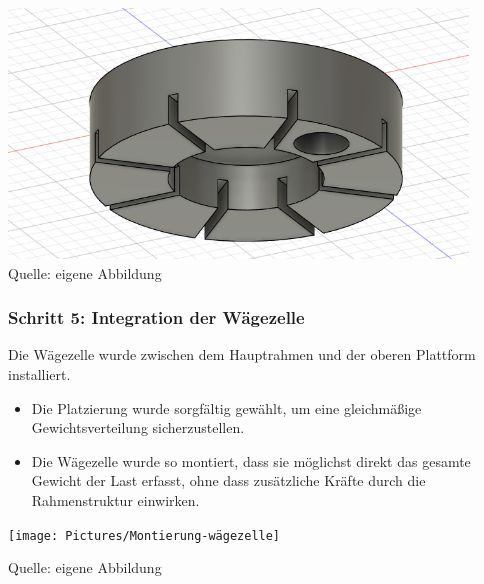 \documentclass[ngerman,12pt,a4paper]{article}
\begin{document}
\begin{center}
\begin{minipage}{0.4\linewidth}
		\end{minipage}
		\hfill 
		\begin{minipage}{0.4\linewidth}
			\centering
			\includegraphics{Pictures/Verbindungselement-3}
			\label{fig:Verbindungselement-3}
			\small Quelle: eigene Abbildung
		\end{minipage}
	\end{center} 
	
	 \subsubsection*{Schritt 5: Integration der Wägezelle}
	 
	 Die Wägezelle wurde zwischen dem Hauptrahmen und der oberen Plattform installiert.
	 \begin{itemize}
	 	\item Die Platzierung wurde sorgfältig gewählt, um eine gleichmäßige Gewichtsverteilung sicherzustellen.
	 	\item Die Wägezelle wurde so montiert, dass sie möglichst direkt das gesamte Gewicht der Last erfasst, ohne dass zusätzliche Kräfte durch die Rahmenstruktur einwirken.
	 \end{itemize}
	 
	 
	 \begin{center} 
	 	\begin{minipage}[t]{0.3\textwidth}
	 		\texttt{[image: Pictures/Montierung-wägezelle]}
	 		\label{fig:modell-fertig}
	 		\vspace{-10pt}
	 		\begin{center}
	 			\par\small Quelle: eigene Abbildung 
	 		\end{center}
	 	\end{minipage} \\[0.75cm]
	 \end{center} 
	 
\end{document}
